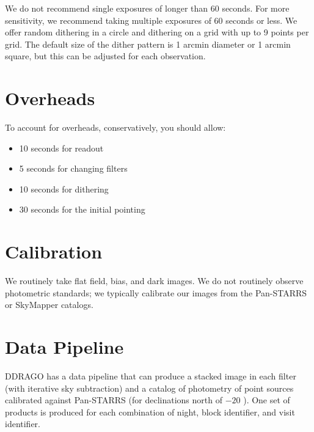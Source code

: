 We do not recommend single exposures of longer than 60 seconds. For more sensitivity, we recommend taking multiple exposures of 60 seconds or less. We offer random dithering in a circle and dithering on a grid with up to 9 points per grid. The default size of the dither pattern is 1 arcmin diameter or 1 arcmin square, but this can be adjusted for each observation.

\section{Overheads}

To account for overheads, conservatively, you should allow:
\begin{itemize}
    \item 10 seconds for readout
    \item 5 seconds for changing filters
    \item 10 seconds for dithering
    \item 30 seconds for the initial pointing
\end{itemize}

\section{Calibration}

We routinely take flat field, bias, and dark images. We do not routinely observe photometric standards; we typically calibrate our images from the Pan-STARRS or SkyMapper catalogs.

\section{Data Pipeline}

DDRAGO has a data pipeline that can produce a stacked image in each filter (with iterative sky subtraction) and a catalog of photometry of point sources calibrated against Pan-STARRS (for declinations north of $-20$ {\deg}).
One set of products is produced for each combination of night, block identifier, and visit identifier.
